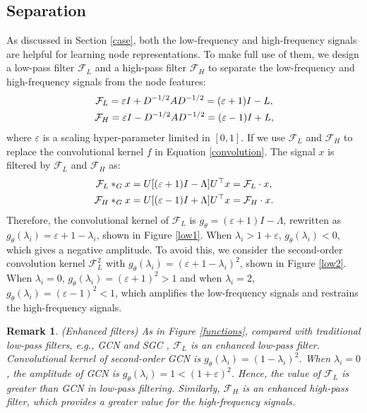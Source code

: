 \documentclass[letterpaper]{article} %
\newtheorem{remark}{Remark}
\begin{document}
\subsection{Separation}
As discussed in Section \ref{case}, both the low-frequency and high-frequency signals are helpful for learning node representations. 
To make full use of them, we design a low-pass filter $\mathcal{F}_{L}$ and a high-pass filter $\mathcal{F}_{H}$ to separate the low-frequency and high-frequency signals from the node features:
\begin{gather}
	\mathcal{F}_{L} = \varepsilon I + D^{-1/2}AD^{-1/2} = (\varepsilon+1) I - L, \notag \\
	\mathcal{F}_{H} = \varepsilon I - D^{-1/2}AD^{-1/2} = (\varepsilon-1) I + L, \label{filters}
\end{gather}
where $\varepsilon$ is a scaling hyper-parameter limited in $[0, 1]$. If we use $\mathcal{F}_{L}$ and $\mathcal{F}_{H}$ to replace the convolutional kernel $f$ in Equation \ref{convolution}. The signal $x$ is filtered by $\mathcal{F}_{L}$ and $\mathcal{F}_{H}$ as:
\begin{gather}
	\mathcal{F}_{L} *_{G} x = U[(\varepsilon+1) I - \Lambda]U^{\top}x = \mathcal{F}_{L} \cdot x, \notag \\
	\mathcal{F}_{H} *_{G} x = U[(\varepsilon-1) I + \Lambda]U^{\top}x = \mathcal{F}_{H} \cdot x.
	\label{filterings}
\end{gather}
Therefore, the convolutional kernel of $\mathcal{F}_{L}$ is $g_{\theta}=(\varepsilon+1) I - \Lambda$, rewritten as $g_{\theta}(\lambda_{i})=\varepsilon+1-\lambda_{i}$, shown in Figure \ref{low1}. When $\lambda_{i} > 1+\varepsilon$, $g_{\theta}(\lambda_{i}) < 0$, which gives a negative amplitude. 
To avoid this, we consider the second-order convolution kernel $\mathcal{F}_{L}^{2}$ with $g_{\theta}(\lambda_{i})=(\varepsilon+1-\lambda_{i})^{2}$, shown in Figure \ref{low2}. When $\lambda_{i} = 0$, $g_{\theta}(\lambda_{i}) = (\varepsilon+1)^{2} > 1$ and when $\lambda_{i} = 2$, $g_{\theta}(\lambda_{i}) = (\varepsilon-1)^{2} < 1$, which amplifies the low-frequency signals and restrains the high-frequency signals.
\begin{remark}
	(Enhanced filters) As in Figure \ref{functions}, compared with traditional low-pass filters, e.g., GCN and SGC \cite{SGC}, $\mathcal{F}_{L}$ is an enhanced low-pass filter. Convolutional kernel of second-order GCN is $g_{\theta}(\lambda_{i})=(1-\lambda_{i})^{2}$. When $\lambda_{i}=0$, the amplitude of GCN is $g_{\theta}(\lambda_{i})=1<(1+\varepsilon)^{2}$. Hence, the value of $\mathcal{F}_{L}$ is greater than GCN in low-pass filtering. Similarly, $\mathcal{F}_{H}$ is an enhanced high-pass filter, which provides a greater value for the high-frequency signals.
\end{remark}
\end{document}
